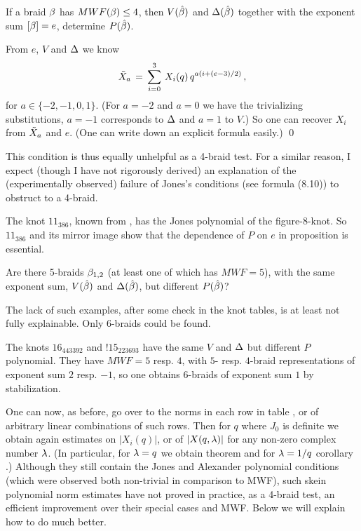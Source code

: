 \begin{prop}\label{pp7.6}
If a braid $\beta$ has $MWF(\beta)\le 4$, then $V(\hat{\beta})$ and
$\Delta(\hat{\beta})$ together with the exponent sum $[\beta]=e$,
determine $P(\hat{\beta})$.
\end{prop}

\proof From $e$, $V$ and $\Delta$ we know
\[
\tilde X_a\,=\,\sum_{i=0}^3\,X_i(q)\,q^{a(i+(e-3)/2)}\,,
\]
for $a\in\{-2,-1,0,1\}$. (For $a=-2$ and $a=0$ we have the
trivializing substitutions, $a=-1$ corresponds to $\Delta$ and
$a=1$ to $V$.) So one can recover $X_i$ from $\tilde X_a$
and $e$. (One can write down an explicit formula easily.) \qed

This condition is thus equally unhelpful as a 4-braid
test. For a similar reason, I expect (though I have not
rigorously derived) an explanation of the (experimentally
observed) failure of Jones's conditions \cite[\S 8]{Jones}
(see formula (8.10)) to obstruct to a 4-braid.

\begin{exam}
The knot $11_{386}$, known from \cite{LickMil}, has the
Jones polynomial of the figure-8-knot. So $11_{386}$ and its mirror
image show that the dependence of $P$ on $e$ in proposition
 is essential.
\end{exam}

\begin{question}
Are there 5-braids $\beta_{1,2}$ (at least one of which has 
$MWF=5$), with the same exponent sum,
$V(\hat{\beta})$ and $\Delta(\hat{\beta})$, but different $P(\hat{\beta})$?
\end{question}

The lack of such examples, after some check in the knot tables,
is at least not fully explainable. Only 6-braids could be found.

\begin{exam}
The knots $16_{443392}$ and $!15_{223693}$ have the same $V$
and $\Delta$ but different $P$ polynomial. They have $MWF=5$ resp. $4$,
with $5$- resp. $4$-braid representations of exponent sum $2$ resp.
$-1$, so one obtains 6-braids of exponent sum $1$ by stabilization.
\end{exam}

One can now, as before, go over to the norms in each
row in table , or of arbitrary linear
combinations of such rows. Then for $q$ where $J_0$ is
definite we obtain again estimates on $|X_i(q)|$, or of
$|X(q,\lambda)|$ for any non-zero complex number $\lambda$. (In
particular, for $\lambda=q$ we obtain theorem  and
for $\lambda=1/q$ corollary .) Although they still
contain the Jones and Alexander polynomial conditions (which
were observed both non-trivial in comparison to MWF), such
skein polynomial norm estimates have not proved in practice,
as a 4-braid test, an efficient improvement over their special
cases and MWF. Below we will explain how to do much better.


